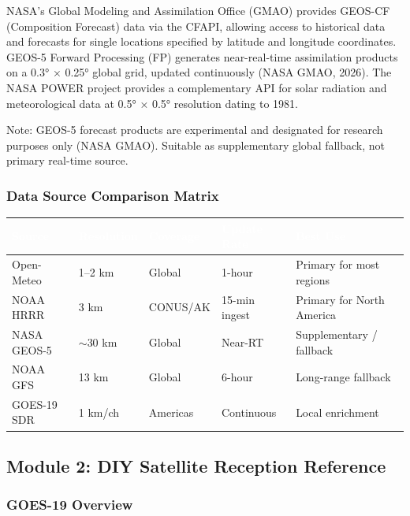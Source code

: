 \documentclass[11pt,letterpaper]{article}
\newcommand{\tableheader}[1]{\textbf{\sffamily\textcolor{white}{#1}}}
\begin{document}
NASA's Global Modeling and Assimilation Office (GMAO) provides GEOS-CF (Composition Forecast) data via the CFAPI, allowing access to historical data and forecasts for single locations specified by latitude and longitude coordinates. GEOS-5 Forward Processing (FP) generates near-real-time assimilation products on a 0.3° × 0.25° global grid, updated continuously (NASA GMAO, 2026). The NASA POWER project provides a complementary API for solar radiation and meteorological data at 0.5° × 0.5° resolution dating to 1981.

Note: GEOS-5 forecast products are experimental and designated for research purposes only (NASA GMAO). Suitable as supplementary global fallback, not primary real-time source.

\subsubsection{Data Source Comparison Matrix}

\begin{center}
\begin{tabularx}{\textwidth}{L{2.8cm}C{1.5cm}C{1.5cm}C{1.8cm}L{3cm}}
\toprule
{}
\tableheader{Source} & \tableheader{Resolution} & \tableheader{Coverage} & \tableheader{Update Rate} & \tableheader{Best Use} \\
\midrule
Open-Meteo & 1--2 km & Global & 1-hour & Primary for most regions \\
NOAA HRRR & 3 km & CONUS/AK & 15-min ingest & Primary for North America \\
NASA GEOS-5 & $\sim$30 km & Global & Near-RT & Supplementary / fallback \\
NOAA GFS & 13 km & Global & 6-hour & Long-range fallback \\
GOES-19 SDR & 1 km/ch & Americas & Continuous & Local enrichment \\
\bottomrule
\end{tabularx}
\end{center}

\subsection{Module 2: DIY Satellite Reception Reference}

\subsubsection{GOES-19 Overview}
\end{document}
